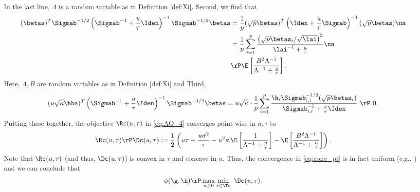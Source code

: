 In the last line, $\Lambda$ is a random variable as in Definition \ref{def:Xi}. 
%
 Second, we find that
\begin{align}
(\betas)^T\Sigmab^{-1/2}\left(\Sigmab^{-1}+\frac{u}{\tau}\Iden\right)^{-1}\Sigmab^{-1/2}\betas &= \frac{1}{p}(\sqrt{p}\betas)^T\left(\Iden+\frac{u}{\tau}\Sigmab\right)^{-1}(\sqrt{p}\betas) \nn\\
&= \frac{1}{p}\sum_{i=1}^{p}\frac{\left(\sqrt{p}\betas_i/\sqrt{\lai}\right)^2}{\lai^{-1}+\frac{u}{\tau}}\nn\\
&\rP \E\left[\frac{B^2\Lambda^{-1}}{\Lambda^{-1}+\frac{u}{\tau}}\right].
\end{align}
Here, $\Lambda,B$ are random variables as in Definition \ref{def:Xi} and 
Third, 
\begin{align}
(u\sqrt{\kappa}\hba)^T\left(\Sigmab^{-1}+\frac{u}{\tau}\Iden\right)^{-1}\Sigmab^{-1/2}\betas = u\sqrt{\kappa} \cdot \frac{1}{p}\sum_{i=1}
^p \frac{\h_i\Sigmab_{i,i}^{-1/2}(\sqrt{p}\betas_i)}{\Sigmab_{i,i}^{-1}+\frac{u}{\tau}\Iden} ~\rP~ 0.
\end{align}
Putting these together, the objective $\Rc(u,\tau)$ in \eqref{eq:AO_4} converges point-wise in $u,\tau$ to
\begin{align}
\Rc(u,\tau)\rP\Dc(u,\tau) := \frac{1}{2}\left({u\tau} + \frac{u\sigma^2}{\tau} - u^2\kappa\,\E\left[ \frac{1}{\Lambda^{-1}+\frac{u}{\tau}} \right] - \E\left[\frac{B^2\Lambda^{-1}}{\Lambda^{-1}+\frac{u}{\tau}}\right] \right).\label{eq:conv_pt}
\end{align}
Note that $\Rc(u,\tau)$ (and thus, $\Dc(u,\tau)$) is convex in $\tau$ and concave in $u$. Thus, the convergence in \eqref{eq:conv_pt} is in fact uniform (e.g., \cite{AG1982}) and we can conclude that 
\begin{align}\label{eq:Dc0}
\phi(\g,\h) \rP \max_{u\geq 0}\min_{\tau\in\Tc}~ \Dc(u,\tau).
\end{align}
